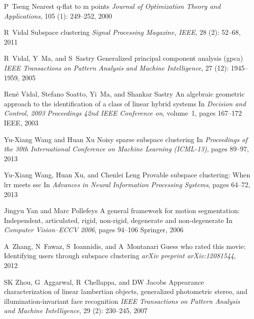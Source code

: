 \documentclass[12pt,heading]{ctexbook}
\begin{document}
\begin{thebibliography}{99}
    P~Tseng
    \newblock Nearest q-flat to m points
    \newblock \emph{Journal of Optimization Theory and Applications}, 105
    (1): 249--252, 2000

    R~Vidal
    \newblock Subspace clustering
    \newblock \emph{Signal Processing Magazine, IEEE}, 28 (2):
    52--68, 2011

    R~Vidal, Y~Ma, and S~Sastry
    \newblock Generalized principal component analysis (gpca)
    \newblock \emph{IEEE Transactions on Pattern Analysis and Machine
    Intelligence}, 27 (12): 1945--1959, 2005

    Ren{\'e} Vidal, Stefano Soatto, Yi~Ma, and Shankar Sastry
    \newblock An algebraic geometric approach to the identification of a class of
    linear hybrid systems
    \newblock In \emph{Decision and Control, 2003 Proceedings 42nd IEEE
    Conference on}, volume~1, pages 167--172 IEEE, 2003

    Yu-Xiang Wang and Huan Xu
    \newblock Noisy sparse subspace clustering
    \newblock In \emph{Proceedings of the 30th International Conference on Machine
    Learning (ICML-13)}, pages 89--97, 2013

    Yu-Xiang Wang, Huan Xu, and Chenlei Leng
    \newblock Provable subspace clustering: When lrr meets ssc
    \newblock In \emph{Advances in Neural Information Processing Systems}, pages
    64--72, 2013

    Jingyu Yan and Marc Pollefeys
    \newblock A general framework for motion segmentation: Independent,
    articulated, rigid, non-rigid, degenerate and non-degenerate
    \newblock In \emph{Computer Vision--ECCV 2006}, pages 94--106 Springer, 2006

    A~Zhang, N~Fawaz, S~Ioannidis, and A~Montanari
    \newblock Guess who rated this movie: Identifying users through subspace
    clustering
    \newblock \emph{arXiv preprint arXiv:12081544}, 2012

    SK Zhou, G~Aggarwal, R~Chellappa, and DW Jacobs
    \newblock Appearance characterization of linear lambertian objects, generalized
    photometric stereo, and illumination-invariant face recognition
    \newblock \emph{IEEE Transactions on Pattern Analysis and Machine
    Intelligence}, 29 (2): 230--245, 2007

\end{thebibliography}
\end{document}
